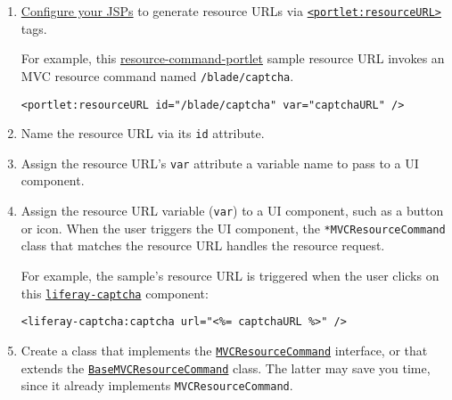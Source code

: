 \begin{enumerate}
\def\labelenumi{\arabic{enumi}.}
\item
  \href{/docs/7-2/appdev/-/knowledge_base/a/configuring-the-view-layer}{Configure
  your JSPs} to generate resource URLs via
  \href{https://docs.liferay.com/dxp/portal/7.2-latest/taglibs/util-taglib/portlet/resourceURL.html}{\texttt{\textless{}portlet:resourceURL\textgreater{}}}
  tags.

  For example, this
  \href{https://github.com/liferay/liferay-blade-samples/tree/7.1/gradle/apps/resource-command-portlet}{resource-command-portlet}
  sample resource URL invokes an MVC resource command named
  \texttt{/blade/captcha}.

\begin{verbatim}
<portlet:resourceURL id="/blade/captcha" var="captchaURL" />
\end{verbatim}
\item
  Name the resource URL via its \texttt{id} attribute.
\item
  Assign the resource URL's \texttt{var} attribute a variable name to
  pass to a UI component.
\item
  Assign the resource URL variable (\texttt{var}) to a UI component,
  such as a button or icon. When the user triggers the UI component, the
  \texttt{*MVCResourceCommand} class that matches the resource URL
  handles the resource request.

  For example, the sample's resource URL is triggered when the user
  clicks on this
  \href{https://docs.liferay.com/dxp/apps/foundation/latest/taglibdocs/liferay-captcha/captcha.html}{\texttt{liferay-captcha}}
  component:

\begin{verbatim}
<liferay-captcha:captcha url="<%= captchaURL %>" />
\end{verbatim}
\item
  Create a class that implements the
  \href{https://docs.liferay.com/dxp/portal/7.2-latest/javadocs/portal-kernel/com/liferay/portal/kernel/portlet/bridges/mvc/MVCResourceCommand.html}{\texttt{MVCResourceCommand}}
  interface, or that extends the
  \href{https://docs.liferay.com/dxp/portal/7.2-latest/javadocs/portal-kernel/com/liferay/portal/kernel/portlet/bridges/mvc/BaseMVCResourceCommand.html}{\texttt{BaseMVCResourceCommand}}
  class. The latter may save you time, since it already implements
  \texttt{MVCResourceCommand}.
\end{enumerate}

\noindent\hrulefill

